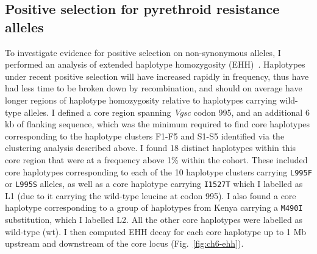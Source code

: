 \begin{refsection}
\subsection{Positive selection for pyrethroid resistance alleles}\label{subsec:results-selection}


To investigate evidence for positive selection on non-synonymous alleles, I performed an analysis of extended haplotype homozygosity (EHH)~\parencite{Sabeti2002}.
%
Haplotypes under recent positive selection will have increased rapidly in frequency, thus have had less time to be broken down by recombination, and should on average have longer regions of haplotype homozygosity relative to haplotypes carrying wild-type alleles.
%
I defined a core region spanning \textit{Vgsc} codon 995, and an additional 6 kb of flanking sequence, which was the minimum required to find core haplotypes corresponding to the haplotype clusters F1-F5 and S1-S5 identified via the clustering analysis described above.
%
I found 18 distinct haplotypes within this core region that were at a frequency above 1\% within the cohort.
%
These included core haplotypes corresponding to each of the 10 haplotype clusters carrying \texttt{L995F} or \texttt{L995S} alleles, as well as a core haplotype carrying \texttt{I1527T} which I labelled as L1 (due to it carrying the wild-type leucine at codon 995).
%
I also found a core haplotype corresponding to a group of haplotypes from Kenya carrying a \texttt{M490I} substitution, which I labelled L2.
%
All the other core haplotypes were labelled as wild-type (wt).
%
I then computed EHH decay for each core haplotype up to 1 Mb upstream and downstream of the core locus (Fig.~\ref{fig:ch6-ehh}).



\end{refsection}
